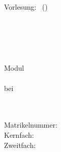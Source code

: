 \ifdefined\layouttitle
\begin{center}
{%
    \scshape\Large\onehalfspacing
    \titel \par}
\end{center}
\vskip 0.5cm
\fi

\ifdefined\layoutzettel
\pagestyle{empty}
\newcommand{\header}{Vorlesung: \vorlesung \hfill  \autor \, (\matrikelnummer)\\ \zettel \hfill \gruppe \\ \datum}
\header
\fi

\ifdefined\layouttitlepage
\thispagestyle{empty}
\begin{titlepage}
\singlespacing

\quad \\[4cm]

\begin{center}
\begin{minipage}{0.9\linewidth}
\begin{center}
\textsc{\MakeLowercase{\autor}} \\[1cm]
{%
    \scshape\Large\onehalfspacing
    \titel \par}
\end{center}
\end{minipage}

\vskip 3.8cm
\emph{\art}
\end{center}

\vfill

\noindent\begin{minipage}{0.5\linewidth}
Modul \emph{\modul} \\
\veranstaltung \\
bei \dozentin \\
\institut \\
\universitaet
\end{minipage}
\begin{minipage}{0.5\linewidth}
\begin{flushright}
\email \\
Matrikelnummer: \matrikelnummer \\
Kernfach:  \\
Zweitfach: \zweitfach \\
\datum
\end{flushright}
\end{minipage}
\end{titlepage}
\fi

